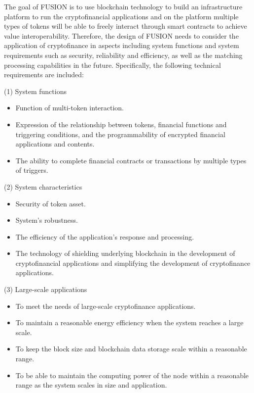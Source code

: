 \documentclass[a4paper,12pt]{article}
\begin{document}
The goal of FUSION is to use blockchain technology to build an infrastructure platform to run the cryptofinancial applications and on the platform multiple types of tokens will be able to freely interact through smart contracts to achieve value interoperability. Therefore, the design of FUSION needs to consider the application of cryptofinance in aspects including system functions and system requirements such as security, reliability and efficiency, as well as the matching processing capabilities in the future. Specifically, the following technical requirements are included:

(1) System functions
\begin {itemize} [itemindent = 1em]
\item Function of multi-token interaction.
\item Expression of the relationship between tokens, financial functions and triggering conditions, and the programmability of encrypted financial applications and contents.
\item The ability to complete financial contracts or transactions by multiple types of triggers.
\end {itemize}

(2) System characteristics
\begin {itemize} [itemindent = 1em]
\item Security of token asset.
\item System's robustness.
\item The efficiency of the application's response and processing.
\item The technology of shielding underlying blockchain in the development of cryptofinancial applications and simplifying the development of cryptofinance applications.
\end {itemize}

(3) Large-scale applications
\begin {itemize} [itemindent = 1em]
\item To meet the needs of large-scale cryptofinance applications.
\item To maintain a reasonable energy efficiency when the system reaches a large scale.
\item To keep the block size and blockchain data storage scale within a reasonable range.
\item To be able to maintain the computing power of the node within a reasonable range as the system scales in size and application.
\end {itemize}
\end{document}
